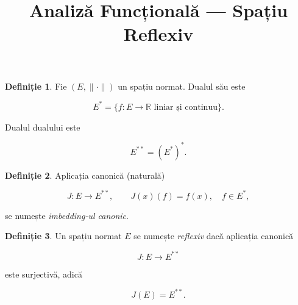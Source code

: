 \documentclass[12pt]{article}
\title{Analiză Funcțională — Spațiu Reflexiv}
\author{}
\date{}
\theoremstyle{definition}
\newtheorem{definition}{Definiție}
\begin{document}
\maketitle

\begin{definition}
Fie $(E,\|\cdot\|)$ un spațiu normat. Dualul său este


\[
E^* = \{ f : E \to \mathbb{R} \text{ liniar și continuu} \}.
\]


Dualul dualului este


\[
E^{**} = (E^*)^*.
\]


\end{definition}

\begin{definition}
Aplicația canonică (naturală)


\[
J : E \to E^{**}, \qquad J(x)(f) = f(x),\quad f \in E^*,
\]


se numește \emph{imbedding-ul canonic}.
\end{definition}

\begin{definition}
Un spațiu normat $E$ se numește \emph{reflexiv} dacă aplicația canonică


\[
J : E \to E^{**}
\]


este surjectivă, adică


\[
J(E) = E^{**}.
\]


\end{definition}
\end{document}

